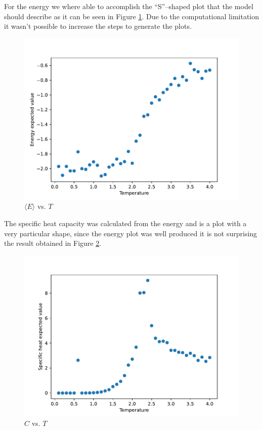 \documentclass[
    10pt,
    journal,
    compsoc,
    english
]{IEEEtran}
\begin{document}
For the energy we where able to accomplish the ``S''--shaped plot that the model should describe as it can be seen in Figure \ref{fig:energy}. Due to the computational limitation it wasn't possible to increase the steps to generate the plots.
\begin{figure}[hbt]
    \centering
    \includegraphics[width=0.95\columnwidth]{img/energy.pdf}
    \caption{$\langle E\rangle$ vs. $T$}
    \label{fig:energy}
\end{figure}

The specific heat capacity was calculated from the energy and is a plot with a very particular shape, since the energy plot was well produced it is not surprising the result obtained in Figure \ref{fig:heat}.
\begin{figure}[hbt]
    \centering
    \includegraphics[width=0.95\columnwidth]{img/heat.pdf}
    \caption{$C$ vs. $T$}
    \label{fig:heat}
\end{figure}
\end{document}
